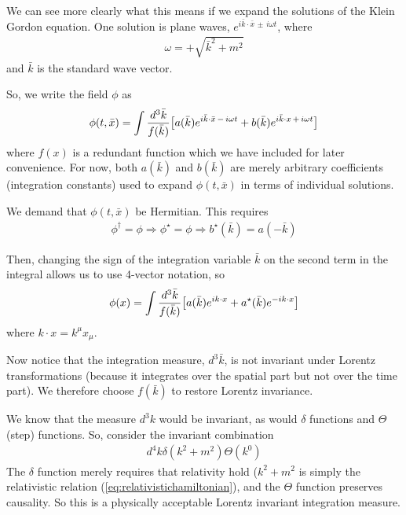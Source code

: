 \documentclass[12pt,epsf]{article}
\def\nolabel{\nonumber }
\def\nolabel{\nonumber }
\begin{document}
We can see more clearly what this means if we expand the solutions of
the Klein Gordon equation.  One solution is plane waves, $e^{i\bar k
\cdot \bar x \, \pm \, i \omega t}$, where 
\begin{eqnarray}
\omega = +\sqrt{\bar k^2 + m^2} \label{eq:defomega}
\end{eqnarray}
and $\bar k$ is the standard wave vector.  

So, we write the field $\phi$ as 
\begin{eqnarray}
\phi(t,\bar x) = \int {d^3 \bar k \over f(\bar k)} \big[a(\bar
k)e^{i\bar k \cdot \bar x \,- \, i \omega t} + b (\bar k)e^{i \bar k \cdot x
\, + \, i \omega t} \big]\nolabel
\end{eqnarray}
where $f(x)$ is a redundant function which we have included for later
convenience.  For now, both $a(\bar k)$ and $b(\bar k)$ are merely
arbitrary coefficients (integration constants) used to expand
$\phi(t,\bar x)$ in terms of individual solutions.  

We demand that $\phi(t,\bar x)$ be Hermitian.  This requires 
\begin{eqnarray}
\phi^{\dagger} = \phi \Rightarrow \phi^{\star} = \phi \Rightarrow
b^{\star}(\bar k) = a(-\bar k)\nolabel
\end{eqnarray}

Then, changing the sign of the integration variable $\bar k$ on the
second term in the integral allows us to use 4-vector notation, so
\begin{eqnarray}
\phi(x) = \int {d^3 \bar k \over f(\bar k)} \big[ a(\bar k)e^{ik\cdot
x} + a^{\star}(\bar k)e^{-ik\cdot x}\big]\nolabel
\end{eqnarray}
where $k\cdot x = k^{\mu} x_{\mu}$.  

Now notice that the integration measure, $d^3\bar k$, is not invariant
under Lorentz transformations (because it integrates over the spatial
part but not over the time part).  We therefore choose $f(\bar k)$ to
restore Lorentz invariance.  

We know that the measure $d^3k $ would be invariant, as would $\delta$
functions and $\Theta$ (step) functions.  So, consider the invariant
combination
\begin{eqnarray}
d^4k \delta(k^2+m^2)\Theta(k^0) \label{eq:firstinvmeasure}
\end{eqnarray}
The $\delta$ function merely requires that relativity hold ($k^2+m^2$
is simply the relativistic relation (\ref{eq:relativistichamiltonian}),
and the $\Theta$ function preserves causality.	So this is a physically
acceptable Lorentz invariant integration measure.  
\end{document}
